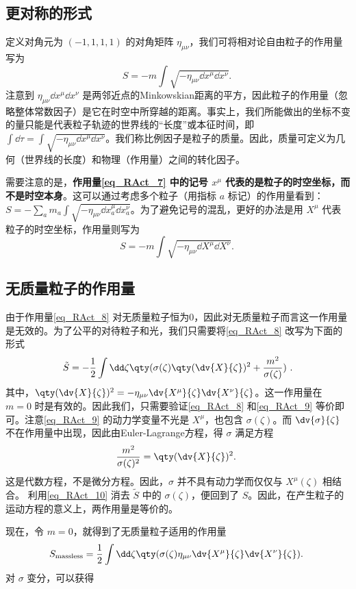 \subsection{更对称的形式}
定义对角元为 $(-1,1,1,1)$ 的对角矩阵 $\eta_{\mu\nu}$，我们可将相对论自由粒子的作用量写为
\begin{equation}\label{eq_RAct_7}
S=-m\int \sqrt{-\eta_{\mu\nu}\dd x^\mu\dd x^\nu}.~
\end{equation}
注意到 $\eta_{\mu\nu}\dd x^\mu\dd x^\nu$ 是两邻近点的Minkowskian距离的平方，因此粒子的作用量（忽略整体常数因子）是它在时空中所穿越的距离。事实上，我们所能做出的坐标不变的量只能是代表粒子轨迹的世界线的“长度”或本征时间，即 $\int\dd \tau=\int \sqrt{-\eta_{\mu\nu}\dd x^\mu\dd x^\nu}$。我们称比例因子是粒子的质量。因此，质量可定义为几何（世界线的长度）和物理（作用量）之间的转化因子。

需要注意的是，\textbf{作用量\autoref{eq_RAct_7} 中的记号 $x^\mu$ 代表的是粒子的时空坐标，而不是时空本身}。这可以通过考虑多个粒子（用指标 $a$ 标记）的作用量看到： $S=-\sum_a m_a\int \sqrt{-\eta_{\mu\nu}\dd x_a^\mu\dd x_a^\nu}$。为了避免记号的混乱，更好的办法是用 $X^\mu$ 代表粒子的时空坐标，作用量则写为
\begin{equation}\label{eq_RAct_8}
S=-m\int \sqrt{-\eta_{\mu\nu}\dd X^\mu\dd X^\nu}.~
\end{equation}


\subsection{无质量粒子的作用量}
由于作用量\autoref{eq_RAct_8} 对无质量粒子恒为0，因此对无质量粒子而言这一作用量是无效的。为了公平的对待粒子和光，我们只需要将\autoref{eq_RAct_8} 改写为下面的形式
\begin{equation}\label{eq_RAct_9}
\tilde S=-\frac{1}{2}\int\dd\zeta\qty(\sigma(\zeta)\qty(\dv{X}{\zeta})^2+\frac{m^2}{\sigma(\zeta)})~.
\end{equation}
其中，$\qty(\dv{X}{\zeta})^2=-\eta_{\mu\nu}\dv{X^\mu}{\zeta}\dv{X^\nu}{\zeta}$。这一作用量在 $m=0$ 时是有效的。因此我们，只需要验证\autoref{eq_RAct_8} 和\autoref{eq_RAct_9} 等价即可。注意\autoref{eq_RAct_9} 的动力学变量不光是 $X^\mu$，也包含 $\sigma(\zeta)$。而 $\dv{\sigma}{\zeta}$ 不在作用量中出现，因此由Euler-Lagrange方程，得 $\sigma$ 满足方程
\begin{equation}\label{eq_RAct_10}
\frac{m^2}{\sigma(\zeta)^2}=\qty(\dv{X}{\zeta})^2.~
\end{equation}
这是代数方程，不是微分方程。因此，$\sigma$ 并不具有动力学而仅仅与 $X^\mu(\zeta)$ 相结合。
利用\autoref{eq_RAct_10} 消去 $\tilde S$ 中的 $\sigma(\zeta)$，便回到了 $S$。因此，在产生粒子的运动方程的意义上，两作用量是等价的。

现在，令 $m=0$，就得到了无质量粒子适用的作用量
\begin{equation}
 S_{\mathrm{massless}}=\frac{1}{2}\int\dd\zeta\qty(\sigma(\zeta)\eta_{\mu\nu}\dv{X^\mu}{\zeta}\dv{X^\nu}{\zeta}).~
\end{equation}
对 $\sigma$ 变分，可以获得 $$


